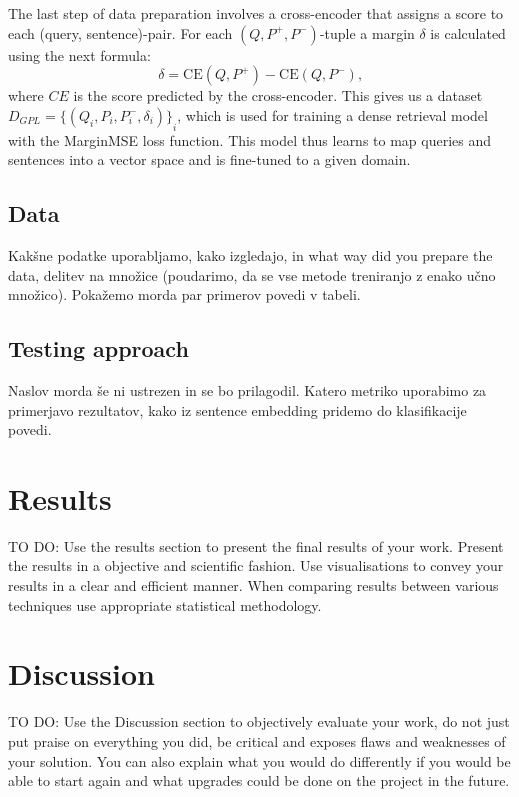 \documentclass[fleqn,moreauthors,10pt]{ds_report}
\begin{document}
The last step of data preparation involves a cross-encoder that assigns a score to each (query, sentence)-pair. For each $(Q, P^{+}, P^{-})$-tuple a margin $\delta$ is calculated using the next formula:
\begin{equation}
	\delta = \text{CE}(Q, P^{+}) - \text{CE}(Q, P^{-})\text{,}
\label{eq:delta}
\end{equation}
where $CE$ is the score predicted by the cross-encoder. This gives us a dataset $D_{GPL} = {\{ ( Q_i, P_i, P_i^{-}, \delta_i ) \}}_i$, which is used for training a dense retrieval model with the MarginMSE loss function. This model thus learns to map queries and sentences into a vector space and is fine-tuned to a given domain.


\subsection*{Data}
Kakšne podatke uporabljamo, kako izgledajo, in what way did you prepare the data, delitev na množice (poudarimo, da se vse metode treniranjo z enako učno množico).
Pokažemo morda par primerov povedi v tabeli.


\subsection*{Testing approach}
Naslov morda še ni ustrezen in se bo prilagodil.
Katero metriko uporabimo za primerjavo rezultatov, kako iz sentence embedding pridemo do klasifikacije povedi.




\section*{Results}

TO DO:
Use the results section to present the final results of your work. Present the results in a objective and scientific fashion. Use visualisations to convey your results in a clear and efficient manner. When comparing results between various techniques use appropriate statistical methodology.



\section*{Discussion}

TO DO:
Use the Discussion section to objectively evaluate your work, do not just put praise on everything you did, be critical and exposes flaws and weaknesses of your solution. You can also explain what you would do differently if you would be able to start again and what upgrades could be done on the project in the future.
\end{document}
